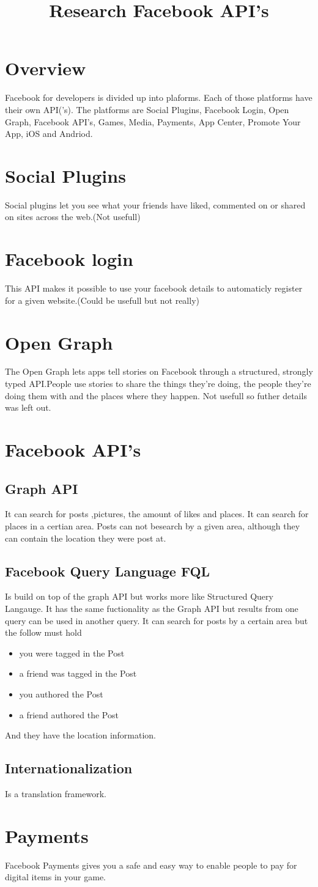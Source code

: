 \documentclass{article}
\title{Research Facebook API's}
\begin{document}
\section{Overview}
Facebook for developers is divided up into plaforms.
Each of those platforms have their own API('s).
The platforms are Social Plugins, Facebook Login, Open Graph, Facebook API's, Games, Media, Payments, App Center, Promote Your App, iOS and Andriod.
\section{Social Plugins}
Social plugins let you see what your friends have liked, commented on or shared on sites across the web.(Not usefull) 
\section{Facebook login}
This API makes it possible to use your facebook details to automaticly register for
a given website.(Could be usefull but not really)
\section{Open Graph}
The Open Graph lets apps tell stories on Facebook through a structured, strongly typed API.People use stories to share the things they're doing, the people they're doing them with and the places where they happen. Not usefull so futher details was left out.
\section{Facebook API's}
\subsection{Graph API}
It can search for posts ,pictures, the amount of likes and places.
It can search for places in a certian area. Posts can not besearch by a given
area, although they can contain the location they were post at.
\subsection{Facebook Query Language FQL}
Is build on top of the graph API but works more like Structured Query Langauge.
It has the same fuctionality as the Graph API but results from one query can be used in another query. 
It can search for posts by a certain area but the follow must hold
\begin{itemize}
\item you were tagged in the Post
\item a friend was tagged in the Post
\item you authored the Post
\item a friend authored the Post
\end{itemize}
And they have the location information.
\subsection{Internationalization}
Is a translation framework.
\section{Payments}
Facebook Payments gives you a safe and easy way to enable people to pay for digital items in your game.
\end{document}
